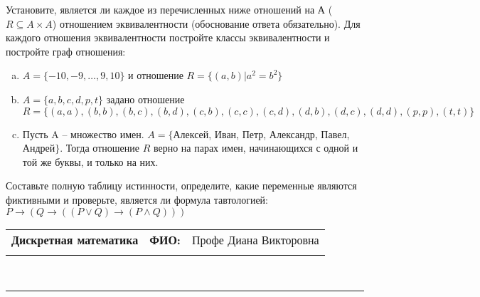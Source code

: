 \documentclass[10pt]{exam}
\newcommand{\class}{Дискретная математика}
\newcommand{\examdate}{}
\begin{document}
\begin{questions}
\question
Установите, является ли каждое из перечисленных ниже отношений на А ($R \subseteq A \times A$) отношением эквивалентности (обоснование ответа обязательно). Для каждого отношения эквивалентности постройте классы 
эквивалентности и постройте граф отношения:
\begin{enumerate} [a)]\setcounter{enumi}{0}
\item $A = \{-10, -9, … , 9, 10\}$ и отношение $R = \{(a,b)|a^{2} = b^{2}\}$
\item $A = \{a, b, c, d, p, t\}$ задано отношение $R = \{(a, a), (b, b), (b, c), (b, d), (c, b), (c, c), (c, d), (d, b), (d, c), (d, d), (p,p), (t,t)\}$
\item Пусть A – множество имен. $A = \{ $Алексей, Иван, Петр, Александр, Павел, Андрей$ \}$. Тогда отношение $R$ верно на парах имен, начинающихся с одной и той же буквы, и только на них.
\end{enumerate}\question Составьте полную таблицу истинности, определите, какие переменные являются фиктивными и проверьте, является ли формула тавтологией:
$ P \rightarrow (Q \rightarrow ((P \lor Q) \rightarrow (P \land Q)))$

\end{questions}
\newpage
\begin{flushright}
\begin{tabular}{p{2.8in} r l}
\textbf{\class} & \textbf{ФИО:} &Профе Диана Викторовна
\\

\textbf{\examdate} &&\\
\end{tabular}\\
\end{flushright}
\rule[1ex]{\textwidth}{.1pt}
\end{document}
